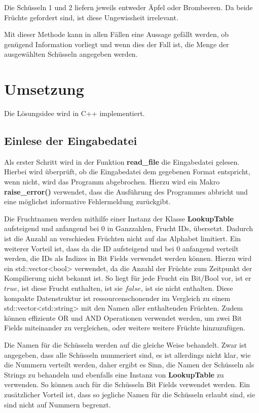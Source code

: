 \documentclass[a4paper,10pt,ngerman]{scrartcl}
\begin{document}
Die Schüsseln 1 und 2 liefern jeweils entweder Äpfel oder Brombeeren.
Da beide Früchte gefordert sind, ist diese Ungewissheit irrelevant.

Mit dieser Methode kann in allen Fällen eine Aussage gefällt werden, ob genügend Information vorliegt und wenn dies der Fall ist, die Menge der ausgewählten Schüsseln angegeben werden.

\section{Umsetzung}
Die Lösungsidee wird in C++ implementiert.

\subsection{Einlese der Eingabedatei}
Als erster Schritt wird in der Funktion \textbf{read\_file} die Eingabedatei gelesen.
Hierbei wird überprüft, ob die Eingabedatei dem gegebenen Format entspricht, wenn nicht, wird das Programm abgebrochen.
Hierzu wird ein Makro \textbf{raise\_error()} verwendet, dass die Ausführung des Programmes abbricht und eine möglichst informative Fehlermeldung zurückgibt.

Die Fruchtnamen werden mithilfe einer Instanz der Klasse \textbf{LookupTable} aufsteigend und anfangend bei $0$ in Ganzzahlen, Frucht IDs, übersetzt.
Dadurch ist die Anzahl an verschieden Früchten nicht auf das Alphabet limitiert.
Ein weiterer Vorteil ist, dass da die ID aufsteigend und bei $0$ anfangend verteilt werden, die IDs als Indizes in Bit Fields verwendet werden können.
Hierzu wird ein std::vector<bool> verwendet, da die Anzahl der Früchte zum Zeitpunkt der Kompilierung nicht bekannt ist.
So liegt für jede Frucht ein Bit/Bool vor, ist er $true$, ist diese Frucht enthalten, ist sie $false$, ist sie nicht enthalten.
Diese kompakte Datenstruktur ist ressourcenschonender im Vergleich zu einem std::vector<std::string> mit den Namen aller enthaltenden Früchten.
Zudem können effiziente OR und AND Operationen verwendet werden, um zwei Bit Fields miteinander zu vergleichen, oder weitere weitere Früchte hinzuzufügen.

Die Namen für die Schüsseln werden auf die gleiche Weise behandelt.
Zwar ist angegeben, dass alle Schüsseln nummeriert sind, es ist allerdings nicht klar, wie die Nummern verteilt werden, daher ergibt es Sinn, die Namen der Schüsseln als Strings zu behandeln und ebenfalls eine Instanz von \textbf{LookupTable} zu verwenden.
So können auch für die Schüsseln Bit Fields verwendet werden.
Ein zusätzlicher Vorteil ist, dass so jegliche Namen für die Schüsseln erlaubt sind, sie sind nicht auf Nummern begrenzt.
\end{document}
